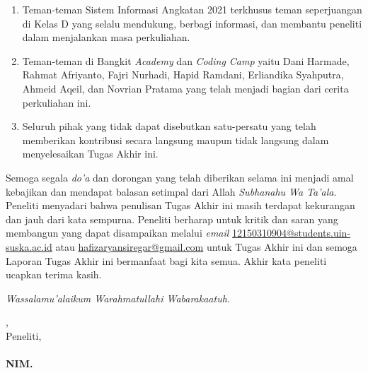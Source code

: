 \begin{enumerate}
	\item Teman-teman Sistem Informasi Angkatan 2021 terkhusus teman seperjuangan di Kelas D yang selalu mendukung, berbagi informasi, dan membantu peneliti dalam menjalankan masa perkuliahan.
	\item Teman-teman di Bangkit \textit{Academy} dan \textit{Coding Camp} yaitu Dani Harmade, Rahmat Afriyanto, Fajri Nurhadi, Hapid Ramdani, Erliandika Syahputra, Ahmeid Aqeil, dan Novrian Pratama yang telah menjadi bagian dari cerita perkuliahan ini.
	\item Seluruh pihak yang tidak dapat disebutkan satu-persatu yang telah memberikan kontribusi secara langsung maupun tidak langsung dalam menyelesaikan Tugas Akhir ini.
\end{enumerate}

Semoga segala \textit{do'a} dan dorongan yang telah diberikan selama ini menjadi amal kebajikan dan mendapat balasan setimpal dari Allah \textit{Subhanahu Wa Ta’ala}. Peneliti menyadari bahwa penulisan Tugas Akhir ini masih terdapat kekurangan dan jauh dari kata sempurna. Peneliti berharap untuk kritik dan saran yang membangun yang dapat disampaikan melalui \textit{email} \href{mailto:12150310904@students.uin-suska.ac.id}{12150310904@students.uin-suska.ac.id} atau \href{mailto:hafizaryansiregar@gmail.com}{hafizaryansiregar@gmail.com} untuk Tugas Akhir ini dan semoga Laporan Tugas Akhir ini bermanfaat bagi kita semua. Akhir kata peneliti ucapkan terima kasih.

\textit{Wassalamu’alaikum Warahmatullahi Wabarakaatuh.}

\vspace*{0.1cm}

\begin{flushright}
	\kota, \tanggalPersetujuan\\
	Peneliti,\\
	\vspace{2cm}
	\textbf{\underline{\penulis}\\
		\vspace{-0.15cm}
		NIM. \nim}

\end{flushright}
